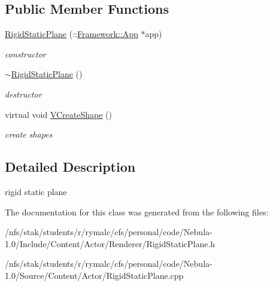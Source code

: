 \subsection*{Public Member Functions}
\begin{DoxyCompactItemize}
\item 
\hypertarget{classContent_1_1Actor_1_1RigidStaticPlane_a04f45e0471e9cc58b8f542acf0c15b47}{
\hyperlink{classContent_1_1Actor_1_1RigidStaticPlane_a04f45e0471e9cc58b8f542acf0c15b47}{RigidStaticPlane} (::\hyperlink{classFramework_1_1App}{Framework::App} $\ast$app)}
\label{classContent_1_1Actor_1_1RigidStaticPlane_a04f45e0471e9cc58b8f542acf0c15b47}

\begin{DoxyCompactList}\small\item\em constructor \item\end{DoxyCompactList}\item 
\hypertarget{classContent_1_1Actor_1_1RigidStaticPlane_af253639edf560cfaddddb57363c200f9}{
\hyperlink{classContent_1_1Actor_1_1RigidStaticPlane_af253639edf560cfaddddb57363c200f9}{$\sim$RigidStaticPlane} ()}
\label{classContent_1_1Actor_1_1RigidStaticPlane_af253639edf560cfaddddb57363c200f9}

\begin{DoxyCompactList}\small\item\em destructor \item\end{DoxyCompactList}\item 
\hypertarget{classContent_1_1Actor_1_1RigidStaticPlane_a8c4e7d1621338bf2d4694f8487ed57a3}{
virtual void \hyperlink{classContent_1_1Actor_1_1RigidStaticPlane_a8c4e7d1621338bf2d4694f8487ed57a3}{VCreateShape} ()}
\label{classContent_1_1Actor_1_1RigidStaticPlane_a8c4e7d1621338bf2d4694f8487ed57a3}

\begin{DoxyCompactList}\small\item\em create shapes \item\end{DoxyCompactList}\end{DoxyCompactItemize}


\subsection{Detailed Description}
rigid static plane 

The documentation for this class was generated from the following files:\begin{DoxyCompactItemize}
\item 
/nfs/stak/students/r/rymalc/cfs/personal/code/Nebula-\/1.0/Include/Content/Actor/Renderer/RigidStaticPlane.h\item 
/nfs/stak/students/r/rymalc/cfs/personal/code/Nebula-\/1.0/Source/Content/Actor/RigidStaticPlane.cpp\end{DoxyCompactItemize}
